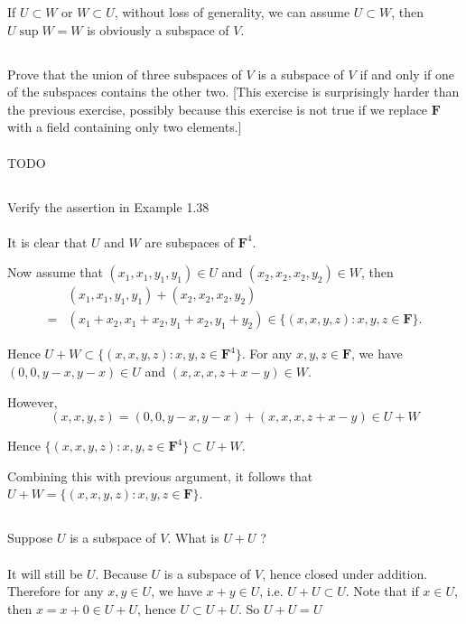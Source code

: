 \documentclass[a4paper]{article}
\begin{document}
If $U\subset W$ or $W\subset U$, without loss of generality, we can assume $U\subset W$, then $U\sup W = W$ is obviously a subspace of $V$.

\subsection{}
Prove that the union of three subspaces of $V$ is a subspace of $V$ if and only if one of the subspaces contains the other two. [This exercise is surprisingly harder than the previous exercise, possibly because this exercise is not true if we replace $\mathbf{F}$ with a field containing only two elements.]
\paragraph{}
TODO

\subsection{}
Verify the assertion in Example 1.38
\paragraph{}
It is clear that $U$ and $W$ are subspaces of $\mathbf{F}^4$.

Now assume that $(x_1,x_1,y_1,y_1)\in U$ and $(x_2,x_2,x_2,y_2)\in W$,
then
\[
    \begin{aligned}
          & (x_1,x_1,y_1,y_1)+(x_2,x_2,x_2,y_2)                                     \\
        = & (x_1+x_2,x_1+x_2,y_1+x_2,y_1+y_2) \in \{(x,x,y,z):x,y,z\in\mathbf{F}\}.
    \end{aligned}
\]

Hence $U+W\subset \{(x,x,y,z):x,y,z\in\mathbf{F}^4\}$. For any $x,y,z\in\mathbf{F}$, we have $(0,0,y-x,y-x)\in U$ and $(x,x,x,z+x-y)\in W$.

However,
\[
    (x,x,y,z)=(0,0,y-x,y-x)+(x,x,x,z+x-y)\in U+W
\]

Hence $\{(x,x,y,z):x,y,z\in\mathbf{F}^4\}\subset U+W$.

Combining this with previous argument, it follows that $U+W=\{(x,x,y,z):x,y,z\in\mathbf{F}\}$.

\subsection{}
Suppose $U$ is a subspace of $V .$ What is $U+U$ ?
\paragraph{}
It will still be $U$. Because $U$ is a subspace of $V$, hence closed under addition. Therefore for any $x,y\in U$, we have $x+y\in U$, i.e. $U+U\subset U$.
Note that if $x\in U$, then $x=x+0\in U+U$, hence $U\subset U+U$. So $U+U=U$
\end{document}
